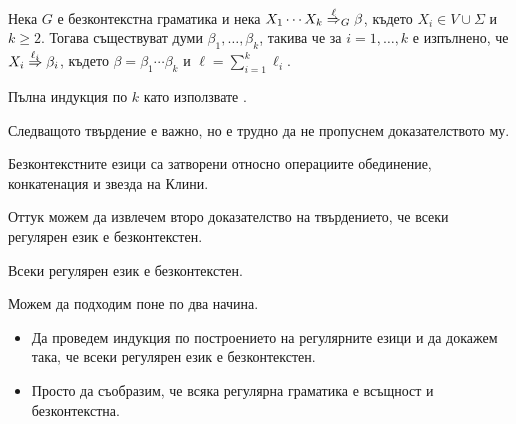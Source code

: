 \begin{proposition}\label{pr:grammar:divide}
  Нека $G$ е безконтекстна граматика и нека $X_1\cdots X_k \stackrel{{\ell}}{\Rightarrow}_G \beta$, където $X_i \in V \cup \Sigma$ и $k \geq 2$.
  Тогава съществуват думи $\beta_1,\dots,\beta_k$, такива че за $i = 1,\dots, k$ е изпълнено, че
  $X_i \stackrel{{\ell_i}}{\Rightarrow} \beta_i$, където $\beta = \beta_1\cdots \beta_k$ и $\ell = \sum^k_{i = 1}\ell_i$.
\end{proposition}
\begin{hint}
  Пълна индукция по $k$ като използвате .
\end{hint}

Следващото твърдение е важно, но е трудно да не пропуснем доказателството му.
\begin{important}
  \begin{proposition}
    Безконтекстните езици са затворени относно операциите обединение, конкатенация и звезда на Клини.
  \end{proposition}
\end{important}

Оттук можем да извлечем второ доказателство на твърдението, че всеки регулярен език е безконтекстен.

\begin{proposition}
  Всеки регулярен език е безконтекстен.
\end{proposition}
\begin{hint}
  Можем да подходим поне по два начина.
  \begin{itemize}
  \item
    Да проведем индукция по построението на регулярните езици и да докажем така, че всеки регулярен език е безконтекстен.
  \item
    Просто да съобразим, че всяка регулярна граматика е всъщност и безконтекстна.
  \end{itemize} 
\end{hint}



